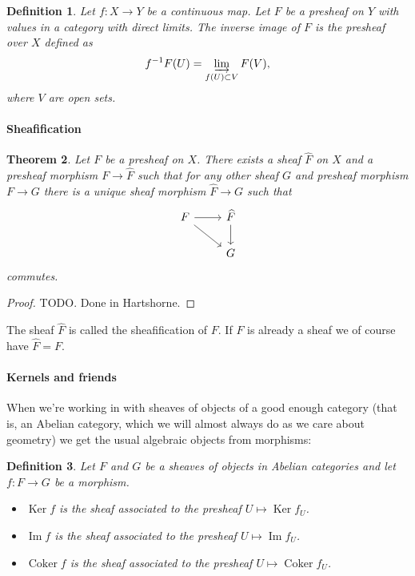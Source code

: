 \documentclass[10pt,a4paper]{article}
\newtheorem{theo}{Theorem}[section]
\newtheorem{defi}[theo]{Definition}
\newtheorem*{proof}{Proof}
\newcommand{\sh}[1]{#1}
\def\Im{\operatorname{Im}}
\DeclareMathOperator{\Ker}{Ker}
\DeclareMathOperator{\Coker}{Coker}
\begin{document}
\begin{defi}
Let $f : X \to Y$ be a continuous map.
Let $\sh{F}$ be a presheaf on $Y$ with values in a category with direct limits.
The \emph{inverse image} of $\sh{F}$ is the presheaf over $X$ defined as
$$
f^{-1}\sh{F}(U)
= \varinjlim_{f(U) \subset V} \sh{F}(V),
$$
where $V$ are open sets.
\end{defi}


\paragraph{Sheafification}


\begin{theo}
Let $\sh{F}$ be a presheaf on $X$.
There exists a sheaf $\widehat{\sh{F}}$ on $X$ and a presheaf morphism $\sh{F}
\to \widehat{\sh{F}}$ such that for any other sheaf $\sh{G}$ and presheaf
morphism $\sh{F} \to \sh{G}$ there is a unique sheaf morphism 
$\widehat{\sh{F}} \to \sh{G}$ such that 
$$
\begin{tikzcd}
\sh{F} \ar[r] \ar[dr] & \widehat{\sh{F}} \ar[d]
\\
             & \sh{G}
\end{tikzcd}
$$
commutes.
\end{theo}

\begin{proof}
TODO. Done in Hartshorne.
\end{proof}

The sheaf $\widehat{\sh{F}}$ is called the sheafification of $\sh{F}$.
If $\sh{F}$ is already a sheaf we of course have $\widehat{\sh{F}} = \sh{F}$.



\paragraph{Kernels and friends}

When we're working in with sheaves of objects of a good enough category (that
is, an Abelian category, which we will almost always do as we care about
geometry) we get the usual algebraic objects from morphisms:

\begin{defi}
Let $\sh{F}$ and $\sh{G}$ be a sheaves of objects in Abelian categories and let
$f : \sh F \to \sh G$ be a morphism.
\begin{itemize}
\item
$\Ker f$ is the sheaf associated to the presheaf $U \mapsto \Ker f_U$.

\item
$\Im f$ is the sheaf associated to the presheaf $U \mapsto \Im f_U$.

\item
$\Coker f$ is the sheaf associated to the presheaf $U \mapsto \Coker f_U$.
\end{itemize}
\end{defi}
\end{document}
